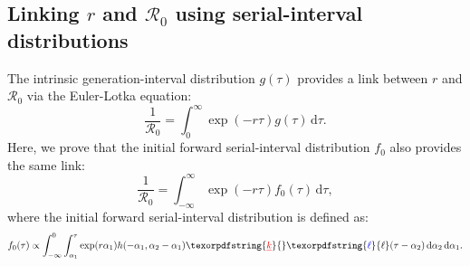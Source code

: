 \documentclass[12pt]{article}
\newcommand{\Rx}[1]{\ensuremath{{\mathcal R}_{#1}}\xspace}
\newcommand{\Ro}{\Rx{0}}
\newcommand{\dd}[1]{\ensuremath{\, \mathrm{d}#1}}
\newcommand{\dtau}{\dd{\tau}}
\newcommand{\gdist}{g} %
\newcommand{\idist}{\ell} %
\providecommand{\DIFaddtex}[1]{{\protect\color{blue}\uwave{#1}}} %
\providecommand{\DIFdeltex}[1]{{\protect\color{red}\sout{#1}}}                      %
\providecommand{\DIFaddbegin}{} %
\providecommand{\DIFaddend}{} %
\providecommand{\DIFdelbegin}{} %
\providecommand{\DIFdelend}{} %
\providecommand{\DIFadd}[1]{\texorpdfstring{\DIFaddtex{#1}}{#1}} %
\providecommand{\DIFdel}[1]{\texorpdfstring{\DIFdeltex{#1}}{}} %
\newcommand{\DIFscaledelfig}{0.5}
\newlength{\DIFdelgraphicswidth} %
\newlength{\DIFdelgraphicsheight} %
\newcommand{\DIFaddincludegraphics}[2][]{{\color{blue}\fbox{\DIFOincludegraphics[#1]{#2}}}} %
\newcommand{\DIFdelincludegraphics}[2][]{%
\sbox{\DIFdelgraphicsbox}{\DIFOincludegraphics[#1]{#2}}%
\settoboxwidth{\DIFdelgraphicswidth}{\DIFdelgraphicsbox} %
\settoboxtotalheight{\DIFdelgraphicsheight}{\DIFdelgraphicsbox} %
\scalebox{\DIFscaledelfig}{%
\parbox[b]{\DIFdelgraphicswidth}{\usebox{\DIFdelgraphicsbox}\\[-\baselineskip] \rule{\DIFdelgraphicswidth}{0em}}\llap{\resizebox{\DIFdelgraphicswidth}{\DIFdelgraphicsheight}{%
\setlength{\unitlength}{\DIFdelgraphicswidth}%
\begin{picture}(1,1)%
\thicklines\linethickness{2pt} %
{\color[rgb]{1,0,0}\put(0,0){\framebox(1,1){}}}%
{\color[rgb]{1,0,0}\put(0,0){\line( 1,1){1}}}%
{\color[rgb]{1,0,0}\put(0,1){\line(1,-1){1}}}%
\end{picture}%
}\hspace*{3pt}}} %
} %
\DeclareRobustCommand{\DIFaddbegin}{\DIFOaddbegin \let\includegraphics\DIFaddincludegraphics} %
\DeclareRobustCommand{\DIFaddend}{\DIFOaddend \let\includegraphics\DIFOincludegraphics} %
\DeclareRobustCommand{\DIFdelbegin}{\DIFOdelbegin \let\includegraphics\DIFdelincludegraphics} %
\DeclareRobustCommand{\DIFdelend}{\DIFOaddend \let\includegraphics\DIFOincludegraphics} %
\begin{document}
\subsection{Linking $r$ and \Ro using serial-interval distributions}

The intrinsic generation-interval distribution $\gdist(\tau)$ provides a link between $r$ and \Ro via the Euler-Lotka equation:
\begin{equation}
\frac{1}{\Ro} = \int_0^\infty \exp(-r\tau) \gdist(\tau) \dtau.
\end{equation}
Here, we prove that the initial forward serial-interval distribution $f_0$ also provides the same link:
\begin{equation}
\frac{1}{\Ro} = \int_{-\infty}^\infty \exp(-r\tau) f_{0}(\tau) \dtau,
\end{equation}
where the initial forward serial-interval distribution is defined as:
\begin{equation}
f_{0}(\tau) \propto \int_{-\infty}^{0} \int_{\alpha_1}^{\tau} \exp(r \alpha_1) h(-\alpha_1, \alpha_2 - \alpha_1) \DIFdelbegin \DIFdel{k}\DIFdelend \DIFaddbegin \DIFadd{\idist}\DIFaddend (\tau - \alpha_2) \, \mathrm{d}\alpha_2\,\mathrm{d}\alpha_1.
\end{equation}
\end{document}
